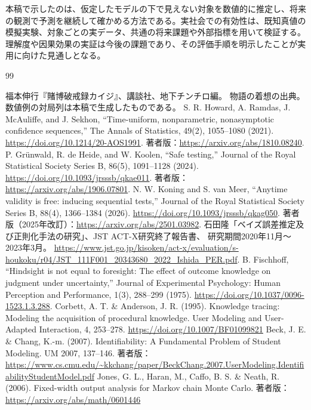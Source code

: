 \documentclass[11pt,a4paper]{article}
\numberwithin{equation}{section}
\begin{document}
本稿で示したのは、仮定したモデルの下で見えない対象を数値的に推定し、将来の観測で予測を継続して確かめる方法である。実社会での有効性は、既知真値の模擬実験、対象ごとの実データ、共通の将来課題や外部指標を用いて検証する。理解度や因果効果の実証は今後の課題であり、その評価手順を明示したことが実用に向けた見通しとなる。
\clearpage
\renewcommand{\refname}{参考文献}
\begin{thebibliography}{99}
\small\raggedright
\setlength{\itemsep}{3pt}
\setlength{\parsep}{0pt}
\setlength{\parskip}{0pt}
福本伸行『賭博破戒録カイジ』、講談社、地下チンチロ編。
物語の着想の出典。数値例の対局列は本稿で生成したものである。
S. R. Howard, A. Ramdas, J. McAuliffe, and J. Sekhon,
``Time-uniform, nonparametric, nonasymptotic confidence sequences,''
The Annals of Statistics, 49(2), 1055--1080 (2021).
\url{https://doi.org/10.1214/20-AOS1991}.
著者版：\url{https://arxiv.org/abs/1810.08240}.
P. Gr\"unwald, R. de Heide, and W. Koolen,
``Safe testing,''
Journal of the Royal Statistical Society Series B, 86(5), 1091--1128 (2024).
\url{https://doi.org/10.1093/jrsssb/qkae011}.
著者版：\url{https://arxiv.org/abs/1906.07801}.
N. W. Koning and S. van Meer,
``Anytime validity is free: inducing sequential tests,''
Journal of the Royal Statistical Society Series B, 88(4), 1366--1384 (2026).
\url{https://doi.org/10.1093/jrsssb/qkag050}.
著者版（2025年改訂）：\url{https://arxiv.org/abs/2501.03982}.
石田隆「ベイズ誤差推定及び正則化手法の研究」、JST ACT-X研究終了報告書、
研究期間2020年11月〜2023年3月。
\url{https://www.jst.go.jp/kisoken/act-x/evaluation/s-houkoku/r04/JST_111F001_20343680_2022_Ishida_PER.pdf}.
B. Fischhoff,
``Hindsight is not equal to foresight: The effect of outcome knowledge on judgment under uncertainty,''
Journal of Experimental Psychology: Human Perception and Performance, 1(3), 288--299 (1975).
\url{https://doi.org/10.1037/0096-1523.1.3.288}.
Corbett, A. T. \& Anderson, J. R. (1995). Knowledge tracing: Modeling the acquisition of procedural knowledge. User Modeling and User-Adapted Interaction, 4, 253–278. \url{https://doi.org/10.1007/BF01099821}
Beck, J. E. \& Chang, K.-m. (2007). Identifiability: A Fundamental Problem of Student Modeling. UM 2007, 137–146. 著者版：\url{https://www.cs.cmu.edu/~kkchang/paper/BeckChang.2007.UserModeling.IdentifiabilityStudentModel.pdf}
Jones, G. L., Haran, M., Caffo, B. S. \& Neath, R. (2006). Fixed-width output analysis for Markov chain Monte Carlo. 著者版：\url{https://arxiv.org/abs/math/0601446}

\end{thebibliography}
\end{document}
